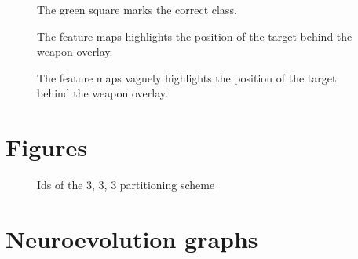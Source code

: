 \begin{figure}[H]
	\begin{center}
	\begin{scriptsize}
		\sffamily
		
	\end{scriptsize}
	\label{fig:hp1}
	\caption[Feature maps image]{The green square marks the correct class.}
	\end{center}
\end{figure}

\begin{figure}[H]
	\begin{center}
	\begin{scriptsize}
		\sffamily
		
	\end{scriptsize}
	\caption[Feature maps]{The feature maps highlights the position of the target behind the weapon overlay.}
	\end{center}
\end{figure}

\begin{figure}[H]
	\begin{center}
	\begin{scriptsize}
		\sffamily
		
	\end{scriptsize}
	\caption[Feature maps]{The feature maps vaguely highlights the position of the target behind the weapon overlay.}
	\end{center}
\end{figure}


\section{Figures}

\begin{figure}[H]
	\begin{scriptsize}
		\sffamily
		\def\svgwidth{\textwidth}
		
	\end{scriptsize}
	\caption{Ids of the 3, 3, 3 partitioning scheme}
	\label{fig:ids}
\end{figure}

\section{Neuroevolution graphs}
\label{sec:neuroevolution-graphs}





